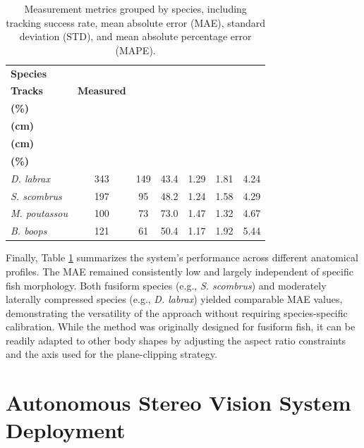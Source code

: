 \documentclass[utf8]{FrontiersinHarvard} %
\begin{document}
\begin{table}[h!]
\centering
\small
\begin{tabular}{lcccccc}
\toprule
\textbf{Species} & \makecell{\textbf{Total}\\\textbf{Tracks}} & \textbf{Measured} & \makecell{\textbf{Success Rate}\\\textbf{(\%)}} & \makecell{\textbf{MAE}\\\textbf{(cm)}} & \makecell{\textbf{STD}\\\textbf{(cm)}} & \makecell{\textbf{MAPE}\\\textbf{(\%)}} \\
\midrule
\textit{D. labrax}    & 343 & 149 & 43.4 & 1.29 & 1.81 & 4.24 \\
\textit{S. scombrus}  & 197 & 95  & 48.2 & 1.24 & 1.58 & 4.29 \\
\textit{M. poutassou} & 100 & 73  & 73.0 & 1.47 & 1.32 & 4.67 \\
\textit{B. boops}     & 121 & 61  & 50.4 & 1.17 & 1.92 & 5.44 \\
\bottomrule
\end{tabular}
\caption{Measurement metrics grouped by species, including tracking success rate, mean absolute error (MAE), standard deviation (STD), and mean absolute percentage error (MAPE).}
\label{tab:metrics_by_species}
\end{table}



Finally, Table \ref{tab:metrics_by_species} summarizes the system's performance across different anatomical profiles. The MAE remained consistently low and largely independent of specific fish morphology. Both fusiform species (e.g., \textit{S. scombrus}) and moderately laterally compressed species (e.g., \textit{D. labrax}) yielded comparable MAE values, demonstrating the versatility of the approach without requiring species-specific calibration. While the method was originally designed for fusiform fish, it can be readily adapted to other body shapes by adjusting the aspect ratio constraints and the axis used for the plane-clipping strategy.





\section{Autonomous Stereo Vision System Deployment}\label{sec::Field-tests}
\end{document}
